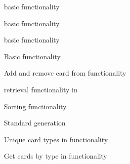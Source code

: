 \begin{DoxyRefList}
\label{test__test000019}%
%
 basic functionality  



\label{test__test000021}%
%
 basic functionality  



\label{test__test000023}%
%
 basic functionality  



\label{test__test000025}%
%
Basic  functionality  



\label{test__test000026}%
%
Add and remove card from  functionality  



\label{test__test000028}%
%
 retrieval functionality in   



\label{test__test000029}%
%
Sorting  functionality  



\label{test__test000030}%
%
Standard  generation  



\label{test__test000031}%
%
Unique card types in  functionality  



\label{test__test000032}%
%
Get cards by type in  functionality  


\end{DoxyRefList}